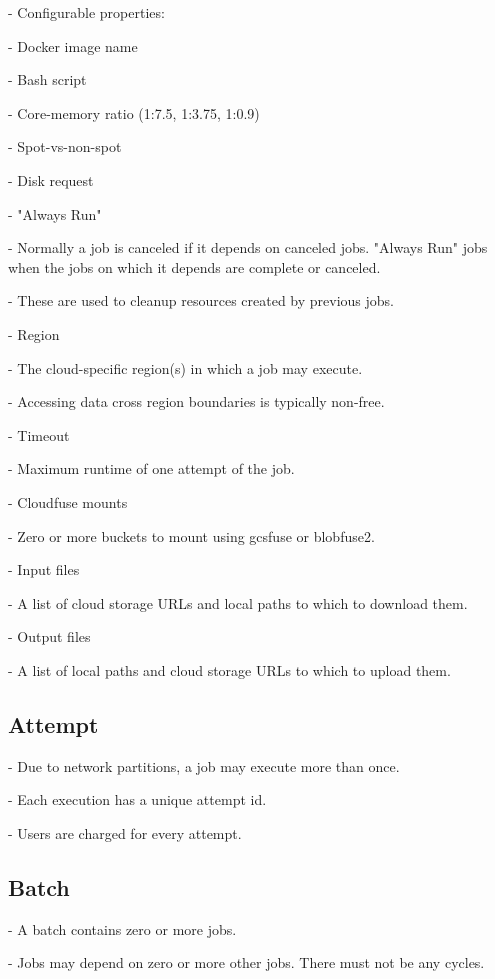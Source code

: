 \documentclass[10pt,a4paper%
]{article}
\begin{document}
    - Configurable properties:

      - Docker image name

      - Bash script

      - Core-memory ratio (1:7.5, 1:3.75, 1:0.9)

      - Spot-vs-non-spot

      - Disk request

      - "Always Run"

        - Normally a job is canceled if it depends on canceled jobs. "Always Run" jobs when the jobs on which it depends are complete or canceled.

        - These are used to cleanup resources created by previous jobs.

      - Region

        - The cloud-specific region(s) in which a job may execute.

        - Accessing data cross region boundaries is typically non-free.

      - Timeout

        - Maximum runtime of one attempt of the job.

      - Cloudfuse mounts

        - Zero or more buckets to mount using gcsfuse or blobfuse2.

      - Input files

        - A list of cloud storage URLs and local paths to which to download them.

      - Output files

        - A list of local paths and cloud storage URLs to which to upload them.

\subsection{Attempt}

    - Due to network partitions, a job may execute more than once.

    - Each execution has a unique attempt id.

    - Users are charged for every attempt.

\subsection{Batch}

    - A batch contains zero or more jobs.

    - Jobs may depend on zero or more other jobs. There must not be any cycles.
\end{document}
